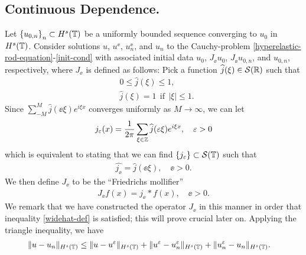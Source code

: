 	\subsection{Continuous Dependence.}
	Let $\left\{ u_{0, n} \right\}_n \subset H^s(\mathbb{T})$ be a uniformly bounded
sequence converging to $u_0$ in $H^s(\mathbb{T})$.
Consider solutions $u $, $u^\ee$, $u^\ee_n$, and $u_n$ to the Cauchy-problem
\eqref{hyperelastic-rod-equation}-\eqref{init-cond}
with associated initial data $u_0$, $J_\ee u_0$,
$J_\ee u_{0,n}$, and $u_{0,n}$, respectively, where $J_\ee$ is defined as follows: Pick a function $\widehat{j}(\xi) \in \mathcal{S}(\mathbb{R})$ such that
	\begin{equation}
		\label{0u}
		\begin{split}
			& 0 \le \widehat{j}(\xi) \le 1,
			\\
			& \widehat{j}(\xi) = 1 \ \ \text{if} \ \ |\xi| \le 1.
		\end{split}
	\end{equation}
	Since $\sum_{-M}^M \widehat{j}(\ee \xi) e^{i \xi x}$ converges uniformly as $M \to
	\infty$, we can let
	\begin{equation}
		\begin{split}
			j_\varepsilon (x) = \frac{1}{2 \pi}\sum_{\xi \in \mathbb{Z}}
			\widehat{j}(\varepsilon \xi) e^{i \xi x}, \quad \varepsilon > 0
			\label{parseval-def}
		\end{split}
	\end{equation}
	which is equivalent to stating that we can find $\left\{ j_\varepsilon
	\right\} \subset \mathcal{S}(\mathbb{T})$ such that
	\begin{equation}
		\begin{split}
			\widehat{j_\ee} = \widehat{j }(\ee \xi), \quad \ee > 0.
			\label{widehat-def}
		\end{split}
	\end{equation}
	We then define $J_\ee$ to be the ``Friedrichs mollifier''
	\begin{equation}
		\label{0'u}
		\begin{split}
			J_\ee f(x) = j_\ee * f(x), \quad \ee>0.
		\end{split}
	\end{equation}
We remark that we have constructed the operator $J_\ee$ in this manner in
order that inequality \eqref{widehat-def} is satisfied; this will prove
crucial later on.
%
Applying
the triangle inequality, we have
\begin{equation*}
	\begin{split}
		\|u - u_n\|_{H^s(\mathbb{T})}
		& \le \|u - u^\varepsilon\|_{H^s(\mathbb{T})}
		+ \|u^\varepsilon - u^{\varepsilon}_n \|_{H^s(\mathbb{T}) }
		+  \|u^{\varepsilon}_n - u_n \|_{H^s(\mathbb{T})}.
	\end{split}
\end{equation*}
